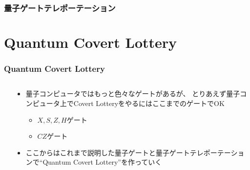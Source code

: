 \begin{frame}
  \frametitle{量子ゲートテレポーテーション}


  \pause

  \pause
\end{frame}

\section{Quantum Covert Lottery}

\begin{frame}
  \frametitle{Quantum Covert Lottery}

  \begin{columns}
    \begin{column}{0.55\textwidth}
      \begin{minipage}[t][.6\textheight][t]{\textwidth}
        \tableofcontents[currentsection]
      \end{minipage}
    \end{column}
    \begin{column}{0.45\textwidth}
      \begin{itemize}
        \item 量子コンピュータではもっと色々なゲートがあるが、
        とりあえず量子コンピュータ上でCovert LotteryをやるにはここまでのゲートでOK
        \begin{itemize}
          \item $X, S, Z, H$ゲート
          \item $CZ$ゲート
        \end{itemize}
        
        \item ここからはこれまで説明した量子ゲートと量子ゲートテレポーテーションで``Quantum Covert Lottery''を作っていく
      \end{itemize}
    \end{column}
  \end{columns}
\end{frame}

\newcommand{\CovertTable}{%
  \begin{tabularx}{0.9\textwidth}{@{}| Y | Y |@{}}
    \hline
    希望 & 意味 \\ \hline
    $0$ & ボブの奢り \\ \hline
    $1$ & 割り勘 \\ \hline
  \end{tabularx}%
}

